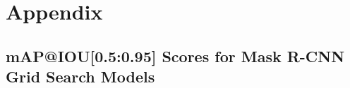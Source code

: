\renewcommand{\thesection}{\Alph{section}} %
\renewcommand{\thesubsection}{\Alph{subsection}} %

\titleformat{\chapter}[display]
{\normalfont\huge\bfseries}{\chaptertitlename\ \thechapter}{20pt}{\Huge} %

\titlespacing*{\chapter}{0pt}{0pt}{20pt}
\chapter{Appendix} 
\titlespacing*{\chapter}{0pt}{50pt}{40pt}

\setcounter{section}{0} %
\setcounter{table}{0}
\renewcommand{\thetable}{\Alph{section}}

\section{mAP@IOU[0.5:0.95] Scores for Mask R-CNN Grid Search Models}\label{app:mAPScoresGridSearch}

